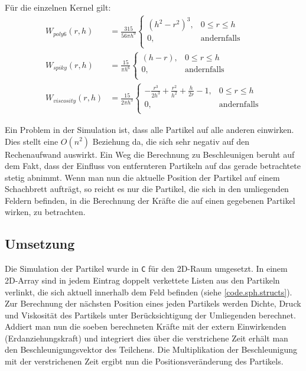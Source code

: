 Für die einzelnen Kernel gilt:
\begin{align}
	W_{poly6}(r, h) &= \frac{315}{56 \pi h^9} 	\begin{cases}
													(h^2 - r^2)^3,   & 0 \leq r \leq h\\
													0, & \text{andernfalls}\\
												\end{cases} \\
	W_{spiky}(r, h) &= \frac{15}{\pi h^6}		\begin{cases}
													(h - r),   & 0 \leq r \leq h\\
													0, & \text{andernfalls}\\
												\end{cases} \\
	W_{viscosity}(r, h) &= \frac{15}{2 \pi h^3}		\begin{cases}
													-\frac{r^3}{2h^3} + \frac{r^2}{h^2} + \frac{h}{2r} - 1,   & 0 \leq r \leq h\\
													0, & \text{andernfalls}\\
												\end{cases}
\end{align}

Ein Problem in der Simulation ist, dass alle Partikel auf alle anderen einwirken. Dies stellt eine $O(n^2)$ Beziehung da, die sich sehr negativ auf den Rechenaufwand auswirkt. Ein Weg die Berechnung zu Beschleunigen beruht auf dem Fakt, dass der Einfluss von entfernteren Partikeln auf das gerade betrachtete stetig abnimmt. Wenn man nun die aktuelle Position der Partikel auf einem Schachbrett aufträgt, so reicht es nur die Partikel, die sich in den umliegenden Feldern befinden, in die Berechnung der Kräfte die auf einen gegebenen Partikel wirken, zu betrachten.

\subsection{Umsetzung}

Die Simulation der Partikel wurde in \texttt{C} für den 2D-Raum umgesetzt. In einem 2D-Array sind in jedem Eintrag doppelt verkettete Listen aus den Partikeln verlinkt, die sich aktuell innerhalb dem Feld befinden (siehe \ref{code.sph.structs}). Zur Berechnung der nächsten Position eines jeden Partikels werden Dichte, Druck und Viskosität des Partikels unter Berücksichtigung der Umliegenden berechnet. Addiert man nun die soeben berechneten Kräfte mit der extern Einwirkenden (Erdanziehungskraft) und integriert dies über die verstrichene Zeit erhält man den Beschleunigungsvektor des Teilchens. Die Multiplikation der Beschleunigung mit der verstrichenen Zeit ergibt nun die Positionsveränderung des Partikels.

